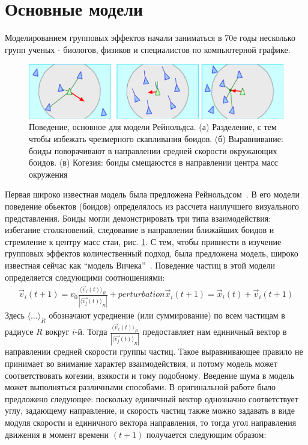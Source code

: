     \section{Основные модели} %
    \label{sec:CompModelsBasics}
    Моделированием групповых эффектов начали заниматься в 70е годы несколько групп ученых - биологов, физиков и специалистов по компьютерной графике. 
    \begin{figure}
        \centering
        \includegraphics[width=\textwidth]{Images/Fig31_CollectiveMotion}
        \caption{Поведение, основное для модели Рейнольдса. (а) Разделение, с тем чтобы избежать чрезмерного скапливания боидов. (б) Выравнивание: боиды поворачивают в направлении средней скорости окружающих боидов. (в) Когезия: боиды смещаюстся в направлении центра масс окружения}
        \label{fig:ReynoldsModel}
    \end{figure}
    Первая широко известная модель была предложена Рейнольдсом~\cite{reynolds1987}. В его модели поведение обьектов (боидов) определялось из рассчета наилучшего визуального представления. Боиды могли демонстрировать три типа взаимодействия: избегание столкновений, следование в направлении ближайших боидов и стремление к центру масс стаи, рис. \ref{fig:ReynoldsModel}. С тем, чтобы привнести в изучение групповых эффектов количественный подход, была предложена модель, широко известная сейчас как ``модель Вичека''~\cite{vicsek1995}. Поведение частиц в этой модели определяется следующими соотношениями:
    \begin{align}
    \label{eq:ViksecEquationsOfMotion}
        \vec{v}_i(t+1) = v_0 \frac{{\langle \vec{v}_i(t) \rangle}_R}{|{\langle \vec{v_j}(t) \rangle}_R|} + perturbation
        \vec{x}_i(t+1) = \vec{x}_i(t)+\vec{v}_i(t+1)
    \end{align}
    Здесь ${\langle \dots \rangle}_R$ обозначают усреднение (или суммирование) по всем частицам в радиусе $R$ вокруг $i$-й. Тогда $ \frac{{\langle \vec{v}_i(t) \rangle}_R}{|{\langle \vec{v_j}(t) \rangle}_R|}$ предоставляет нам единичный вектор в направлении средней скорости группы частиц. Такое выравнивающее правило не принимает во внимание характер взаимодействия, и потому модель может соответствовать когезии, взякости и тому подобному. Введение шума в модель может выполняться различными способами. В оригинальной работе было предложено следующее: поскольку единичный вектор однозначно соответствует углу, задающему направление, и скорость частиц также можно задавать в виде модуля скорости и единичного вектора направления, то тогда угол направления движения в момент времени $(t+1)$ получается следующим образом:
